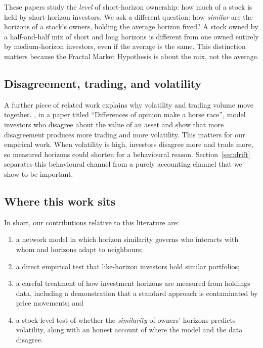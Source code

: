 These papers study the \emph{level} of short-horizon ownership: how much of a stock is held by short-horizon investors. We ask a different question: how \emph{similar} are the horizons of a stock's owners, holding the average horizon fixed? A stock owned by a half-and-half mix of short and long horizons is different from one owned entirely by medium-horizon investors, even if the average is the same. This distinction matters because the Fractal Market Hypothesis is about the mix, not the average.

\subsection{Disagreement, trading, and volatility}

A further piece of related work explains why volatility and trading volume move together. \citet{harrisraviv1993}, in a paper titled ``Differences of opinion make a horse race'', model investors who disagree about the value of an asset and show that more disagreement produces more trading and more volatility. This matters for our empirical work. When volatility is high, investors disagree more and trade more, so measured horizons could shorten for a behavioural reason. Section~\ref{sec:drift} separates this behavioural channel from a purely accounting channel that we show to be important.

\subsection{Where this work sits}

In short, our contributions relative to this literature are:
\begin{enumerate}[leftmargin=*]
\item a network model in which horizon similarity governs who interacts with whom and horizons adapt to neighbours;
\item a direct empirical test that like-horizon investors hold similar portfolios;
\item a careful treatment of how investment horizons are measured from holdings data, including a demonstration that a standard approach is contaminated by price movements; and
\item a stock-level test of whether the \emph{similarity} of owners' horizons predicts volatility, along with an honest account of where the model and the data disagree.
\end{enumerate}
